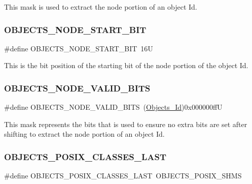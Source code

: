 This mask is used to extract the node portion of an object Id. \mbox{\label{group__RTEMSScoreObject_ga3a254f99c5f72f2f94243a852365a798}} 
\subsubsection{\texorpdfstring{OBJECTS\_NODE\_START\_BIT}{OBJECTS\_NODE\_START\_BIT}}
{\footnotesize\ttfamily \#define O\+B\+J\+E\+C\+T\+S\+\_\+\+N\+O\+D\+E\+\_\+\+S\+T\+A\+R\+T\+\_\+\+B\+IT~16U}

This is the bit position of the starting bit of the node portion of the object Id. \mbox{\label{group__RTEMSScoreObject_gad7ba9def6f96d835fc64f8975ec62475}} 
\subsubsection{\texorpdfstring{OBJECTS\_NODE\_VALID\_BITS}{OBJECTS\_NODE\_VALID\_BITS}}
{\footnotesize\ttfamily \#define O\+B\+J\+E\+C\+T\+S\+\_\+\+N\+O\+D\+E\+\_\+\+V\+A\+L\+I\+D\+\_\+\+B\+I\+TS~(\mbox{\hyperlink{group__RTEMSScoreObject_ga5821f52a51072941bdd603e542d0863e}{Objects\+\_\+\+Id}})0x000000ffU}

This mask represents the bits that is used to ensure no extra bits are set after shifting to extract the node portion of an object Id. \mbox{\label{group__RTEMSScoreObject_ga38a9b0ab40c5fad6bfb0d43bdea992df}} 
\subsubsection{\texorpdfstring{OBJECTS\_POSIX\_CLASSES\_LAST}{OBJECTS\_POSIX\_CLASSES\_LAST}}
{\footnotesize\ttfamily \#define O\+B\+J\+E\+C\+T\+S\+\_\+\+P\+O\+S\+I\+X\+\_\+\+C\+L\+A\+S\+S\+E\+S\+\_\+\+L\+A\+ST~O\+B\+J\+E\+C\+T\+S\+\_\+\+P\+O\+S\+I\+X\+\_\+\+S\+H\+MS}

